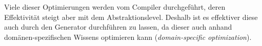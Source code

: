 
Viele dieser Optimierungen werden vom Compiler durchgeführt, deren Effektivität steigt aber mit dem Abstraktionslevel. Deshalb ist es effektiver diese auch durch den Generator durchführen zu lassen, da dieser auch anhand domänen-spezifischen Wissens optimieren kann (\emph{domain-specific optimization}).
